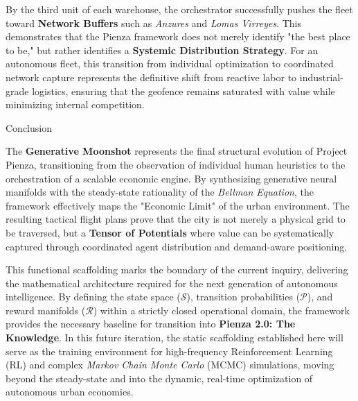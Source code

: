By the third unit of each warehouse, the orchestrator successfully pushes the fleet toward \textbf{Network Buffers} such as \textit{Anzures} and \textit{Lomas Virreyes}. This demonstrates that the Pienza framework does not merely identify "the best place to be," but rather identifies a \textbf{Systemic Distribution Strategy}. For an autonomous fleet, this transition from individual optimization to coordinated network capture represents the definitive shift from reactive labor to industrial-grade logistics, ensuring that the geofence remains saturated with value while minimizing internal competition.

Conclusion


The \textbf{Generative Moonshot} represents the final structural evolution of Project Pienza, transitioning from the observation of individual human heuristics to the orchestration of a scalable economic engine. By synthesizing generative neural manifolds with the steady-state rationality of the \textit{Bellman Equation}, the framework effectively maps the "Economic Limit" of the urban environment. The resulting tactical flight plans prove that the city is not merely a physical grid to be traversed, but a \textbf{Tensor of Potentials} where value can be systematically captured through coordinated agent distribution and demand-aware positioning.

This functional scaffolding marks the boundary of the current inquiry, delivering the mathematical architecture required for the next generation of autonomous intelligence. By defining the state space ($\mathcal{S}$), transition probabilities ($\mathcal{P}$), and reward manifolds ($\mathcal{R}$) within a strictly closed operational domain, the framework provides the necessary baseline for transition into \textbf{Pienza 2.0: The Knowledge}. In this future iteration, the static scaffolding established here will serve as the training environment for high-frequency Reinforcement Learning (RL) and complex \textit{Markov Chain Monte Carlo} (MCMC) simulations, moving beyond the steady-state and into the dynamic, real-time optimization of autonomous urban economies.

